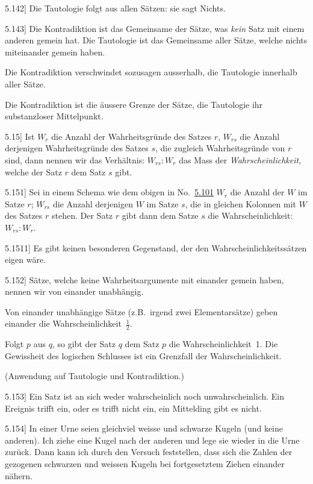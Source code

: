 \documentclass[12pt,oneside]{book}[2007/10/19]
\newcommand{\PropERef}[1]{\hyperref[PropE:#1]{#1}}
\newcommand{\PropositionG}[2]{%
  \item[\phantomsection\label{PropG:#1}\PropERef{#1}] #2%
}
\newcommand{\PropGRef}[1]{\hyperref[PropG:#1]{#1}}
\newcommand{\Emph}[1]{\emph{#1}}%
\newcommand{\zumBeispiel}{z.\;B.}
\begin{document}
\begin{propositions}
\PropositionG{5.142}
{Die Tautologie folgt aus allen Sätzen: sie sagt
Nichts.}


\PropositionG{5.143}
{Die Kontradiktion ist das Gemeinsame der
Sätze, was \Emph{kein} Satz mit einem anderen gemein
hat. Die Tautologie ist das Gemeinsame aller
Sätze, welche nichts miteinander gemein haben.

Die Kontradiktion verschwindet sozusagen
ausserhalb, die Tautologie innerhalb aller Sätze.

Die Kontradiktion ist die äussere Grenze der
Sätze, die Tautologie ihr substanzloser Mittelpunkt.}


\PropositionG{5.15}
{Ist $W_{r}$ die Anzahl der Wahrheitsgründe des
Satzes \glqq{}$r$\grqq{}, $W_{rs}$ die Anzahl derjenigen Wahrheitsgründe
des Satzes \glqq{}$s$\grqq{}, die zugleich Wahrheitsgründe
von \glqq{}$r$\grqq{} sind, dann nennen wir das Verhältnis: $W_{rs} :
W_{r}$ das Mass der \Emph{Wahrscheinlichkeit}, welche
der Satz \glqq{}$r$\grqq{} dem Satz \glqq{}$s$\grqq{} gibt.}


\PropositionG{5.151}
{Sei in einem Schema wie dem obigen in No.~\PropGRef{5.101}
$W_{r}$ die Anzahl der \glqq{}$W$\grqq{} im Satze $r$; $W_{rs}$ die
Anzahl derjenigen \glqq{}$W$\grqq{} im Satze $s$, die in gleichen
Kolonnen mit \glqq{}$W$\grqq{} des Satzes $r$ stehen. Der Satz
$r$ gibt dann dem Satze $s$ die Wahrscheinlichkeit:
$W_{rs} : W_{r}$.}


\PropositionG{5.1511}
{Es gibt keinen besonderen Gegenstand, der den
Wahrscheinlichkeitssätzen eigen wäre.}


\PropositionG{5.152}
{Sätze, welche keine Wahrheitsargumente mit
einander gemein haben, nennen wir von einander
unabhängig.

Von einander unabhängige Sätze (\zumBeispiel\ irgend
zwei Elementarsätze) geben einander die Wahrscheinlichkeit~$\frac{1}{2}$.

Folgt $p$ aus $q$, so gibt der Satz \glqq{}$q$\grqq{} dem Satz
\glqq{}$p$\grqq{} die Wahrscheinlichkeit~1. Die Gewissheit
des logischen Schlusses ist ein Grenzfall der
Wahrscheinlichkeit.

(Anwendung auf Tautologie und Kontradiktion.)}


\PropositionG{5.153}
{Ein Satz ist an sich weder wahrscheinlich noch
unwahrscheinlich. Ein Ereignis trifft ein, oder
es trifft nicht ein, ein Mittelding gibt es nicht.}


\PropositionG{5.154}
{In einer Urne seien gleichviel weisse und
schwarze Kugeln (und keine anderen). Ich ziehe
eine Kugel nach der anderen und lege sie wieder
in die Urne zurück. Dann kann ich durch den
Versuch feststellen, dass sich die Zahlen der
gezogenen schwarzen und weissen Kugeln bei
fortgesetztem Ziehen einander nähern.

}
\end{propositions}
\end{document}
